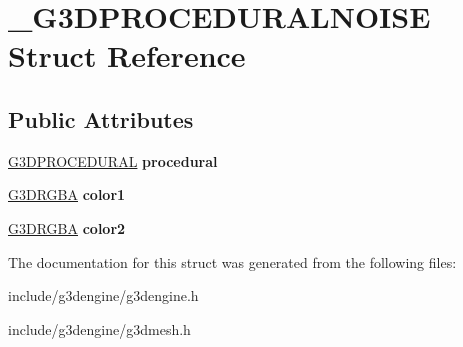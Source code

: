\hypertarget{struct__G3DPROCEDURALNOISE}{}\section{\+\_\+\+G3\+D\+P\+R\+O\+C\+E\+D\+U\+R\+A\+L\+N\+O\+I\+SE Struct Reference}
\label{struct__G3DPROCEDURALNOISE}
\subsection*{Public Attributes}
\begin{DoxyCompactItemize}
\item 
\mbox{\label{struct__G3DPROCEDURALNOISE_a7692ba580b485c8080595f6b40a849a8}} 
\hyperlink{struct__G3DPROCEDURAL}{G3\+D\+P\+R\+O\+C\+E\+D\+U\+R\+AL} {\bfseries procedural}
\item 
\mbox{\label{struct__G3DPROCEDURALNOISE_a4bd9cdb11cb9ba79815f75cb0b2b98de}} 
\hyperlink{structG3DRGBA}{G3\+D\+R\+G\+BA} {\bfseries color1}
\item 
\mbox{\label{struct__G3DPROCEDURALNOISE_a9ada7d7ad5e2354b415ed52ef9d32788}} 
\hyperlink{structG3DRGBA}{G3\+D\+R\+G\+BA} {\bfseries color2}
\end{DoxyCompactItemize}


The documentation for this struct was generated from the following files\+:\begin{DoxyCompactItemize}
\item 
include/g3dengine/g3dengine.\+h\item 
include/g3dengine/g3dmesh.\+h\end{DoxyCompactItemize}
